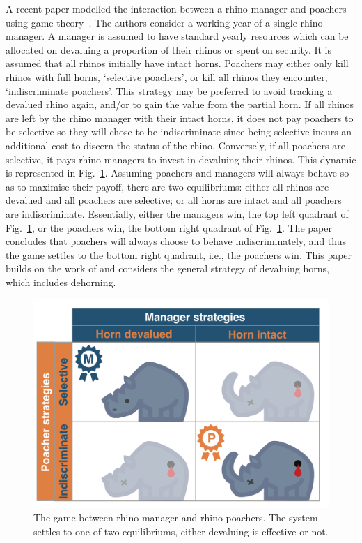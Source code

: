 \documentclass[10pt]{article}
\begin{document}
A recent paper modelled the interaction between a rhino manager and poachers
using game theory~\citep{Lee}. The authors consider a working year of a single
rhino manager. A manager is assumed to have standard yearly resources which
can be allocated on devaluing a proportion of their rhinos or spent on security.
It is assumed that all rhinos initially have intact horns. Poachers may either only
kill rhinos with full horns, `selective poachers', or kill all rhinos they encounter,
`indiscriminate poachers'. This strategy may be preferred to avoid tracking a 
devalued rhino again, and/or to gain the value from the partial horn. If all rhinos
are left by the rhino manager with their intact horns, it does not pay poachers to
be selective so they will chose to be indiscriminate since being selective incurs
an additional cost to discern the status of the rhino. Conversely, if all poachers are
selective, it pays rhino managers to invest in devaluing their rhinos. This dynamic
is represented in Fig.~\ref{fig:RhinoPic}. Assuming poachers and managers will
always behave so as to maximise their payoff, there are two equilibriums: either
all rhinos are devalued and all poachers are selective;
or all horns are intact and all poachers are indiscriminate. Essentially, either
the managers win, the top left quadrant of Fig.~\ref{fig:RhinoPic}, or the poachers
win, the bottom right quadrant of Fig.~\ref{fig:RhinoPic}. The paper~\citep{Lee}
concludes that poachers will always choose to behave indiscriminately, and thus
the game settles to the bottom right quadrant, i.e., the poachers win.
This paper builds on the work of
\cite{Lee} and considers the general strategy of devaluing horns, which includes
dehorning.

\begin{figure}[!htbp]
    \centering
    \includegraphics[scale=0.2]{images/RhinoPic.pdf}
    \caption{\label{fig:RhinoPic} The game between rhino manager and rhino
    poachers. The system settles to one of two equilibriums, either devaluing is
    effective or not.}
\end{figure}
\end{document}
